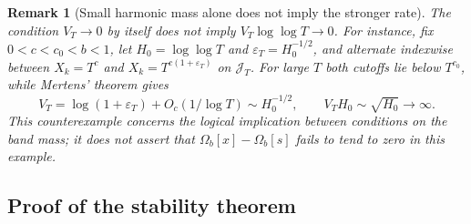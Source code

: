 \documentclass[11pt,reqno]{amsart}
\numberwithin{equation}{section}
\newtheorem{remark}[theorem]{Remark}
\begin{document}
\begin{remark}[Small harmonic mass alone does not imply the stronger rate]
\label{ov:rem:masscounter}
The condition $V_T\to0$ by itself does \emph{not} imply
$V_T\log\log T\to0$. For instance, fix $0<c<c_0<b<1$,
let $H_0=\log\log T$ and $\varepsilon_T=H_0^{-1/2}$, and
alternate indexwise between $X_k=T^c$ and
$X_k=T^{c(1+\varepsilon_T)}$ on $\mathcal J_T$.
For large $T$ both cutoffs lie below $T^{c_0}$, while
Mertens' theorem gives
\[
 V_T=\log(1+\varepsilon_T)+O_c(1/\log T)
 \sim H_0^{-1/2},\qquad V_TH_0\sim\sqrt{H_0}\to\infty.
\]
This counterexample concerns the logical implication between
conditions on the band mass; it does not assert that
$\Omega_b[x]-\Omega_b[s]$ fails to tend to zero in this example.
\end{remark}

\subsection{Proof of the stability theorem}
\end{document}
